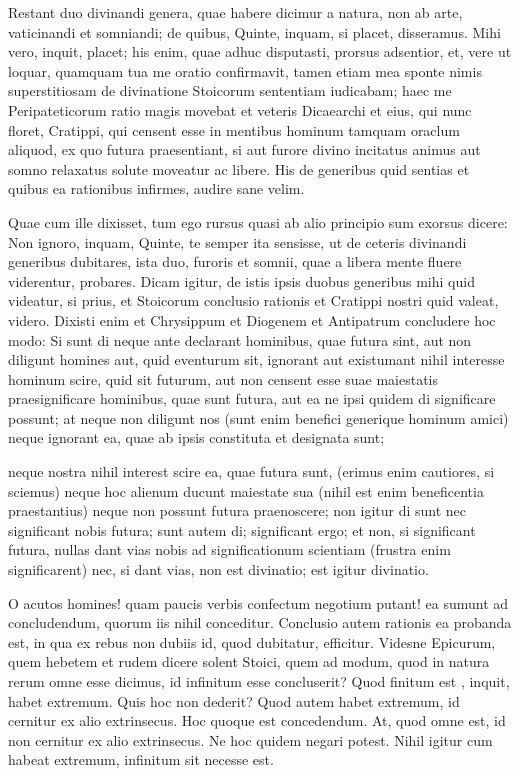  Restant duo divinandi genera, quae habere dicimur a natura, non ab arte, vaticinandi et somniandi; de quibus, Quinte, inquam, si placet, disseramus. Mihi vero, inquit, placet; his enim, quae adhuc disputasti, prorsus adsentior, et, vere ut loquar, quamquam tua me oratio confirmavit, tamen etiam mea sponte nimis superstitiosam de divinatione Stoicorum sententiam iudicabam; haec me Peripateticorum ratio magis movebat et veteris Dicaearchi et eius, qui nunc floret, Cratippi, qui censent esse in mentibus hominum tamquam oraclum aliquod, ex quo futura praesentiant, si aut furore divino incitatus animus aut somno relaxatus solute moveatur ac libere. His de generibus quid sentias et quibus ea rationibus infirmes, audire sane velim.

 Quae cum ille dixisset, tum ego rursus quasi ab alio principio sum exorsus dicere: Non ignoro, inquam, Quinte, te semper ita sensisse, ut de ceteris divinandi generibus dubitares, ista duo, furoris et somnii, quae a libera mente fluere viderentur, probares. Dicam igitur, de istis ipsis duobus generibus mihi quid videatur, si prius, et Stoicorum conclusio rationis et Cratippi nostri quid valeat, videro. Dixisti enim et Chrysippum et Diogenem et Antipatrum concludere hoc modo: Si sunt di neque ante declarant hominibus, quae futura sint, aut non diligunt homines aut, quid eventurum sit, ignorant aut existumant nihil interesse hominum scire, quid sit futurum, aut non censent esse suae maiestatis praesignificare hominibus, quae sunt futura, aut ea ne ipsi quidem di significare possunt; at neque non diligunt nos (sunt enim benefici generique hominum amici) neque ignorant ea, quae ab ipsis constituta et designata sunt;

 neque nostra nihil interest scire ea, quae futura sunt, (erimus enim cautiores, si sciemus) neque hoc alienum ducunt maiestate sua (nihil est enim beneficentia praestantius) neque non possunt futura praenoscere; non igitur di sunt nec significant nobis futura; sunt autem di; significant ergo; et non, si significant futura, nullas dant vias nobis ad significationum scientiam (frustra enim significarent) nec, si dant vias, non est divinatio; est igitur divinatio.

 O acutos homines! quam paucis verbis confectum negotium putant! ea sumunt ad concludendum, quorum iis nihil conceditur. Conclusio autem rationis ea probanda est, in qua ex rebus non dubiis id, quod dubitatur, efficitur. Videsne Epicurum, quem hebetem et rudem dicere solent Stoici, quem ad modum, quod in natura rerum omne esse dicimus, id infinitum esse concluserit? Quod finitum est , inquit, habet extremum. Quis hoc non dederit? Quod autem habet extremum, id cernitur ex alio extrinsecus. Hoc quoque est concedendum. At, quod omne est, id non cernitur ex alio extrinsecus. Ne hoc quidem negari potest. Nihil igitur cum habeat extremum, infinitum sit necesse est.

